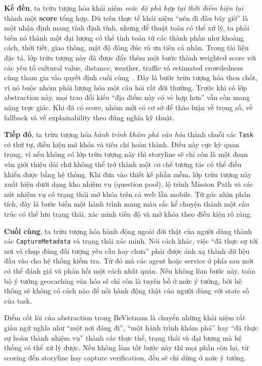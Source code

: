 \textbf{Kế đến}, ta trừu tượng hóa khái niệm \textit{mức độ phù hợp tại
thời điểm hiện tại} thành một \textbf{score} tổng hợp. Dù trên thực tế
khái niệm ``nên đi đâu bây giờ'' là một nhận định mang tính định tính,
nhưng để thuật toán có thể xử lý, ta phải biến nó thành một đại lượng có
thể tính toán từ các thành phần như khoảng cách, thời tiết, giao thông,
mật độ đông đúc và ưu tiên cá nhân. Trong tài liệu đặc tả, lớp trừu
tượng này đã được đẩy thêm một bước thành weighted score với các yếu tố
cultural value, distance, weather, traffic và estimated crowdedness cùng
tham gia vào quyết định cuối cùng~\cite{bevietnam_spec}. Đây là bước
trừu tượng hóa then chốt, vì nó buộc nhóm phải lượng hóa một câu hỏi rất
đời thường. Trước khi có lớp abstraction này, mọi trao đổi kiểu ``địa
điểm này có vẻ hợp hơn'' vẫn còn mang nặng trực giác. Khi đã có score,
nhóm mới có cơ sở để thảo luận về trọng số, về fallback và về
explainability theo đúng nghĩa kỹ thuật.

\textbf{Tiếp đó}, ta trừu tượng hóa \textit{hành trình khám phá văn hóa}
thành chuỗi các \texttt{Task} có thứ tự, điều kiện mở khóa và tiêu chí
hoàn thành. Điều này cực kỳ quan trọng, vì nếu không có lớp trừu tượng
này thì storyline sẽ chỉ còn là một đoạn văn giới thiệu dài chứ không
thể trở thành một cơ chế tương tác có thể điều khiển được bằng hệ thống.
Khi đưa vào thiết kế phần mềm, lớp trừu tượng này xuất hiện dưới dạng
kho nhiệm vụ (question pool), lộ trình Mission Path và các nút nhiệm vụ
có trạng thái mở khóa trên cả web lẫn mobile. Từ góc nhìn phân tích,
đây là bước biến một hành trình mang màu sắc kể chuyện thành một cấu
trúc có thể lưu trạng thái, xác minh tiến độ và mở khóa theo điều kiện
rõ ràng.

\textbf{Cuối cùng}, ta trừu tượng hóa hành động ngoài đời thật của người
dùng thành các \texttt{CaptureMetadata} và trạng thái xác minh. Nói cách
khác, việc ``đã thực sự tới nơi và chụp đúng đối tượng yêu cầu hay
chưa'' phải được ánh xạ thành dữ liệu đầu vào cho hệ thống kiểm tra. Từ
đó mà các agent hoặc service ở phía sau mới có thể đánh giá và phản hồi
một cách nhất quán. Nếu không làm bước này, toàn bộ ý tưởng geocaching
văn hóa sẽ chỉ còn là tuyên bố ở mức ý tưởng, bởi hệ thống sẽ không có
cách nào để nối hành động thật của người dùng với state số của task.

\begin{note}
Điểm cốt lõi của abstraction trong BeVietnam là chuyển những khái niệm
rất giàu ngữ nghĩa như ``một nơi đáng đi'', ``một hành trình khám phá''
hay ``đã thực sự hoàn thành nhiệm vụ'' thành các thực thể, trạng thái và
đại lượng mà hệ thống có thể xử lý được. Nếu không làm tốt bước này thì
mọi phần còn lại, từ scoring đến storyline hay capture verification, đều
sẽ chỉ dừng ở mức ý tưởng.
\end{note}
